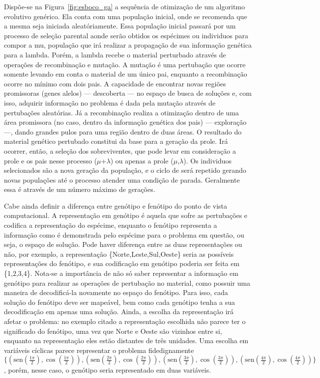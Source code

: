 Dispõe-se na Figura~\ref{fig:esboco_ga} a sequência de otimização de
um algoritmo evolutivo genérico. Ela conta com uma população inicial,
onde se recomenda que a mesma seja iniciada aleatóriamente.  Essa
população inicial passará por um processo de seleção parental aonde
serão obtidos os espécimes ou individuos para compor a \gls{mu},
população que irá realizar a propagação de sua informação genética
para a \gls{lambda}. Porém, a \acl{lambda} recebe o material
perturbado através de operações de recombinação e mutação. A mutação é
uma pertubação que ocorre somente levando em conta o material de um
único pai, enquanto a recombinação ocorre no mínimo com dois pais. A
capacidade de encontrar novas regiões promissoras (genes alelos) ---
descoberta --- no espaço de busca de soluções e, com isso, adquirir
informação no problema é dada pela mutação através de pertubações
aleatórias. Já a recombinação realiza a otimização dentro de uma área
promissora (no caso, dentro da informação genética dos pais) ---
exploração ---, dando grandes pulos para uma região dentro de duas
áreas. O resultado do material genético pertubado constitui da base
para a geração da prole. Irá ocorrer, então, a seleção dos
sobreviventes, que pode levar em consideração a prole e os pais nesse
processo ($\mu$+$\lambda$) ou apenas a prole ($\mu$,$\lambda$). Os
individuos selecionados são a nova geração da população, e o ciclo de
será repetido gerando novas populações até o processo atender uma
condição de parada. Geralmente essa é através de um número máximo de
gerações.

Cabe ainda definir a diferença entre genótipo e fenótipo do ponto de
vista computacional. A representação em genótipo é aquela que sofre as
pertubações e codifica a representação do espécime, enquanto o
fenótipo representa a informação como é demonstrada pelo espécime para
o problema em questão, ou seja, o espaço de solução. Pode haver
diferença entre as duas representações ou não, por exemplo, a
representação \{Norte,Leste,Sul,Oeste\} seria as possíveis
representações do fenótipo, e sua codificação em genótipo poderia ser
feita em \{1,2,3,4\}. Nota-se a importância de não
só saber representar a informação em genótipo para realizar as
operações de pertubação no material, como possuir uma maneira de
decodificá-la novamente no espaço do fenótipo. Para isso, cada solução
do fenótipo deve ser mapeável, bem como cada genótipo tenha a sua
decodificação em apenas uma solução. Ainda, a escolha da representação
irá afetar o problema: no exemplo citado a representação escolhida
não parece ter o significado do fenótipo, uma vez que Norte e Oeste são
vizinhos entre si, enquanto na representação eles estão distantes de três
unidades. Uma escolha em variáveis cíclicas parece representar o
problema fidedignamente
$\{(\text{sen}(\frac{1\pi}{2}),\cos(\frac{1\pi}{2})),
(\text{sen}(\frac{2\pi}{2}),\cos(\frac{2\pi}{2})),
(\text{sen}(\frac{3\pi}{2}),\cos(\frac{3\pi}{2})),
(\text{sen}(\frac{4\pi}{2}),\cos(\frac{4\pi}{2}))\}$, porém, nesse
caso, o genótipo seria representado em duas variáveis.

